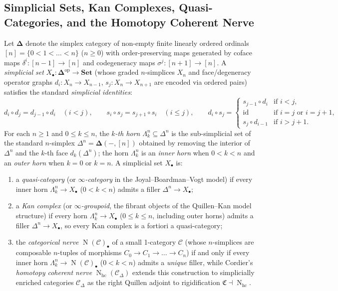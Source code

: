 \subsection{Simplicial Sets, Kan Complexes, Quasi-Categories, and the Homotopy Coherent Nerve}
\label{subsec:simplicial_sets_kan_complexes_quasi_categories}

Let $\boldsymbol{\Delta}$ denote the simplex category of non-empty finite linearly ordered ordinals $[n] = \{0 < 1 < \dots < n\}$ ($n \ge 0$) with order-preserving maps generated by coface maps $\delta^i\colon [n-1] \to [n]$ and codegeneracy maps $\sigma^j\colon [n+1] \to [n]$. A \emph{simplicial set} $X_\bullet\colon \boldsymbol{\Delta}^{\mathrm{op}} \to \mathbf{Set}$ (whose graded $n$-simplices $X_n$ and face/degeneracy operator graphs $d_i\colon X_n \to X_{n-1}$, $s_j\colon X_n \to X_{n+1}$ are encoded via ordered pairs) satisfies the standard \emph{simplicial identities}:
\[
d_i \circ d_j = d_{j-1} \circ d_i \quad (i < j), \qquad
s_i \circ s_j = s_{j+1} \circ s_i \quad (i \le j), \qquad
d_i \circ s_j = \begin{cases}
s_{j-1} \circ d_i & \text{if } i < j, \\
\mathrm{id} & \text{if } i = j \text{ or } i = j+1, \\
s_j \circ d_{i-1} & \text{if } i > j+1.
\end{cases}
\]
For each $n \ge 1$ and $0 \le k \le n$, the \emph{$k$-th horn} $\Lambda^n_k \subseteq \Delta^n$ is the sub-simplicial set of the standard $n$-simplex $\Delta^n = \boldsymbol{\Delta}(-, [n])$ obtained by removing the interior of $\Delta^n$ and the $k$-th face $d_k(\Delta^n)$; the horn $\Lambda^n_k$ is an \emph{inner horn} when $0 < k < n$ and an \emph{outer horn} when $k = 0$ or $k = n$. A simplicial set $X_\bullet$ is:
\begin{enumerate}
\item a \emph{quasi-category} (or \emph{$\infty$-category} in the Joyal--Boardman--Vogt model) if every inner horn $\Lambda^n_k \to X_\bullet$ ($0 < k < n$) admits a filler $\Delta^n \to X_\bullet$;
\item a \emph{Kan complex} (or \emph{$\infty$-groupoid}, the fibrant objects of the Quillen--Kan model structure) if every horn $\Lambda^n_k \to X_\bullet$ ($0 \le k \le n$, including outer horns) admits a filler $\Delta^n \to X_\bullet$, so every Kan complex is a fortiori a quasi-category;
\item the \emph{categorical nerve} $\operatorname{N}(\mathcal{C})_\bullet$ of a small 1-category $\mathcal{C}$ (whose $n$-simplices are composable $n$-tuples of morphisms $C_0 \to C_1 \to \dots \to C_n$) if and only if every inner horn $\Lambda^n_k \to \operatorname{N}(\mathcal{C})_\bullet$ ($0 < k < n$) admits a \emph{unique} filler, while Cordier's \emph{homotopy coherent nerve} $\operatorname{N}_{\mathrm{hc}}(\mathcal{C}_\Delta)$ extends this construction to simplicially enriched categories $\mathcal{C}_\Delta$ as the right Quillen adjoint to rigidification $\mathfrak{C} \dashv \operatorname{N}_{\mathrm{hc}}$.
\end{enumerate}

